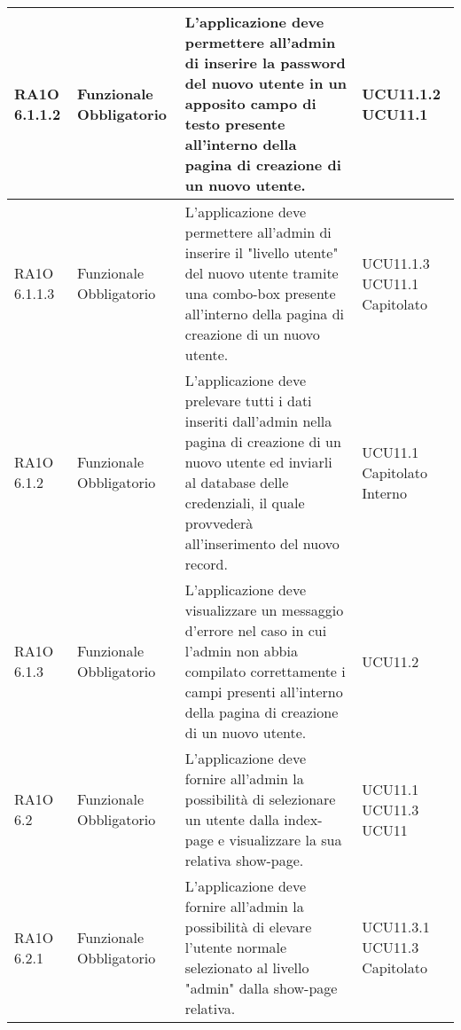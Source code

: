 \begin{center}
\begin{longtable}{ | l | p{2cm} | p{5cm} | p{1.7cm} |}
        RA1O 6.1.1.2 & Funzionale \newline  Obbligatorio  & L'applicazione deve permettere all'admin di inserire la password del nuovo utente in un apposito campo di testo presente all'interno della pagina di creazione di un nuovo utente. &  UCU11.1.2 \newline  UCU11.1 \newline  \\ \hline      
        RA1O 6.1.1.3  & Funzionale \newline  Obbligatorio  & L'applicazione deve permettere all'admin di inserire il "livello utente" del nuovo utente tramite una combo-box presente all'interno della pagina di creazione di un nuovo utente. &  UCU11.1.3 \newline  UCU11.1 \newline  Capitolato \newline  \\ \hline      
        RA1O 6.1.2  & Funzionale \newline  Obbligatorio  & L'applicazione deve prelevare tutti i dati inseriti dall'admin nella pagina di creazione di un nuovo utente ed inviarli al database delle credenziali, il quale provvederà  all'inserimento del nuovo record.
 &  UCU11.1 \newline  Capitolato \newline  Interno \newline  \\ \hline      
        RA1O 6.1.3  & Funzionale \newline  Obbligatorio  & L'applicazione deve visualizzare un messaggio d'errore nel caso in cui l'admin non abbia compilato correttamente i campi presenti all'interno della pagina di creazione di un nuovo utente.
 &  UCU11.2 \newline  \\ \hline      
        RA1O 6.2  & Funzionale \newline  Obbligatorio  & L'applicazione deve fornire all'admin la possibilità di selezionare un utente dalla index-page e visualizzare la sua relativa show-page.
 &  UCU11.1 \newline  UCU11.3 \newline  UCU11 \newline  \\ \hline      
        RA1O 6.2.1 & Funzionale \newline  Obbligatorio  & L'applicazione deve fornire all'admin la possibilità di elevare l'utente normale selezionato al livello "admin" dalla show-page relativa. &  UCU11.3.1 \newline  UCU11.3 \newline  Capitolato \newline  \\ \hline      

\end{longtable}
\end{center}
